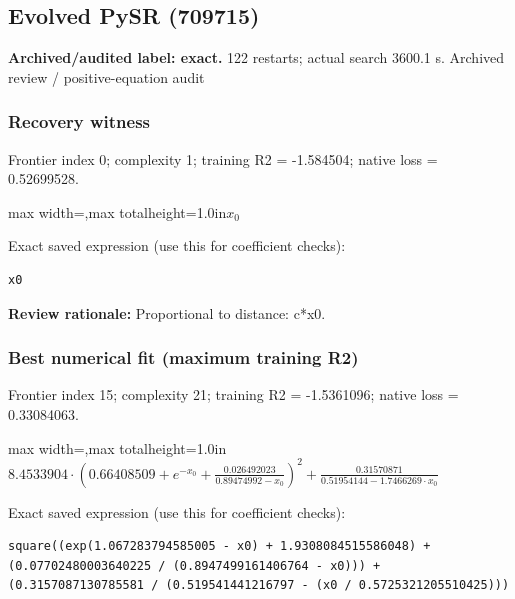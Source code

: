 \documentclass[10pt,letterpaper,landscape]{article}
\begin{document}
\begin{minipage}[t]{0.485\textwidth}
\subsection*{Evolved PySR (709715)}
\textbf{Archived/audited label: exact.} 122 restarts; actual search 3600.1 s.
{\small Archived review / positive-equation audit}
\subsubsection*{Recovery witness}
Frontier index 0; complexity 1; training R2 = -1.584504; native loss = 0.52699528.
\begin{center}\begin{adjustbox}{max width=\linewidth,max totalheight=1.0in}$\displaystyle x_{0}$\end{adjustbox}\end{center}
{\scriptsize Exact saved expression (use this for coefficient checks):}
\begin{lstlisting}
x0
\end{lstlisting}
{\small\textbf{Review rationale:} Proportional to distance: c*x0.}
\subsubsection*{Best numerical fit (maximum training R2)}
Frontier index 15; complexity 21; training R2 = -1.5361096; native loss = 0.33084063.
\begin{center}\begin{adjustbox}{max width=\linewidth,max totalheight=1.0in}$\displaystyle 8.4533904 \cdot \left(0.66408509 + e^{- x_{0}} + \frac{0.026492023}{0.89474992 - x_{0}}\right)^{2} + \frac{0.31570871}{0.51954144 - 1.7466269 \cdot x_{0}}$\end{adjustbox}\end{center}
{\scriptsize Exact saved expression (use this for coefficient checks):}
\begin{lstlisting}
square((exp(1.067283794585005 - x0) + 1.9308084515586048) + (0.07702480003640225 / (0.8947499161406764 - x0))) + (0.3157087130785581 / (0.519541441216797 - (x0 / 0.5725321205510425)))
\end{lstlisting}
\end{minipage}
\clearpage{}\label{hubble-10007}
\end{document}
